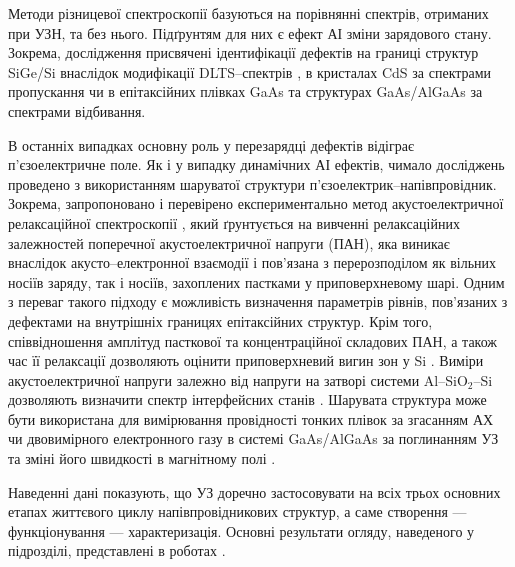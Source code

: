 Методи різницевої спектроскопії базуються на порівнянні спектрів, отриманих при УЗН, та без нього.
Підґрунтям для них є ефект АІ зміни зарядового стану.
Зокрема, дослідження присвячені ідентифікації дефектів на границі структур SiGe/Si внаслідок модифікації DLTS--спектрів \cite{KorotchFTP1996},
в кристалах CdS за спектрами пропускання \cite{KorotFTT93}
чи в епітаксійних плівках GaAs \cite{KorotFTP1994,OSTROVSKII2000,Ostrovskii2001} та
структурах GaAs/AlGaAs \cite{SST:USmethod} за спектрами відбивання.

В останніх випадках основну роль у перезарядці дефектів відіграє п'єзоелектричне поле.
Як і у випадку динамічних АІ ефектів, чимало досліджень проведено з використанням шаруватої структури п'єзоелектрик--напівпровідник.
Зокрема, запропоновано і перевірено експериментально метод акустоелектричної релаксаційної спектроскопії \cite{Saiko1993,OstrovPAN,OlikhSSC}, який ґрунтується на вивченні релаксаційних залежностей
поперечної акустоелектричної напруги (ПАН), яка виникає внаслідок акусто--електронної взаємодії і пов'язана з перерозподілом як вільних носіїв заряду, так і носіїв, захоплених пастками у приповерхневому шарі.
Одним з переваг такого підходу є можливість визначення параметрів рівнів, пов'язаних з дефектами на внутрішніх границях епітаксійних структур.
Крім того,
співвідношення амплітуд пасткової та концентраційної складових ПАН, а також час її релаксації дозволяють оцінити
приповерхневий вигин  зон у Si \cite{PANnew}.
Виміри акустоелектричної напруги залежно від напруги на затворі системи  Al--SiO$_2$--Si дозволяють визначити спектр інтерфейсних станів \cite{USM:Nss}.
Шарувата структура може бути використана для вимірювання провідності тонких плівок за згасанням АХ \cite{USM:provid} чи двовимірного електронного газу в системі  GaAs/AlGaAs за поглинанням УЗ та зміні його швидкості в магнітному полі \cite{PhysRevB83:235318}.












Наведенні дані показують, що УЗ доречно застосовувати на всіх трьох основних етапах життєвого циклу напівпровідникових структур,
а саме створення --- функціонування --- характеризація.
Основні результати огляду, наведеного у підрозділі, представлені в роботах \cite{Olikh:SEMT2004,Olikh:SEMT2011,1UNCPS,2013Buk}.





